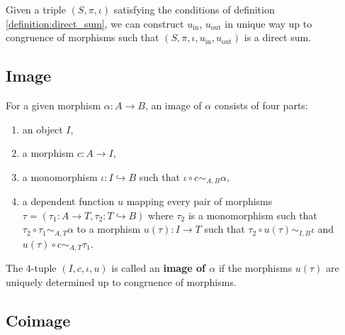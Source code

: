 \begin{remark}
 Given a triple $( S, \pi, \iota )$ satisfying the conditions of definition \ref{definition:direct_sum},
 we can construct $u_{\mathrm{in}}$, $u_{\mathrm{out}}$ in unique way up to congruence of morphisms
 such that $( S, \pi, \iota, u_{\mathrm{in}}, u_{\mathrm{out}} )$ is a direct sum.
\end{remark}


\subsection{Image}

\begin{definition}
 For a given morphism $\alpha: A \rightarrow B$, an image of $\alpha$ consists of four parts:
 \begin{enumerate}
  \item an object $I$,
  \item a morphism $c: A \rightarrow I$,
  \item a monomorphism $\iota: I \hookrightarrow B$ such that $\iota \circ c \sim_{A,B} \alpha$,
  \item a dependent function $u$ mapping every pair of morphisms $\tau = ( \tau_1: A \rightarrow T, \tau_2: T \hookrightarrow B )$
  where $\tau_2$ is a monomorphism
  such that $\tau_2 \circ \tau_1 \sim_{A,T} \alpha$ to a morphism
  $u(\tau): I \rightarrow T$ such that
  $\tau_2 \circ u(\tau) \sim_{I,B} \iota$ and $u(\tau) \circ c \sim_{A,T} \tau_1$.
 \end{enumerate}
  The $4$-tuple $( I, c, \iota, u )$ is called an \textbf{image of $\alpha$} if the morphisms $u( \tau )$ are uniquely determined up to
 congruence of morphisms.
\end{definition}

\subsection{Coimage}


